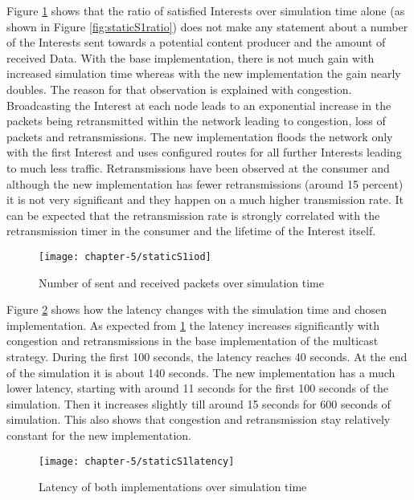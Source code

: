 Figure \ref{fig:staticS1iod} shows that the ratio of satisfied Interests over simulation time alone (as shown in Figure \ref{fig:staticS1ratio}) does not make any statement about a number of the Interests sent towards a potential content producer and the amount of received Data. With the base implementation, there is not much gain with increased simulation time whereas with the new implementation the gain nearly doubles. The reason for that observation is explained with congestion. Broadcasting the Interest at each node leads to an exponential increase in the packets being retransmitted within the network leading to congestion, loss of packets and retransmissions. The new implementation floods the network only with the first Interest and uses configured routes for all further Interests leading to much less traffic. Retransmissions have been observed at the consumer and although the new implementation has fewer retransmissions (around 15 percent) it is not very significant and they happen on a much higher transmission rate. It can be expected that the retransmission rate is strongly correlated with the retransmission timer in the consumer and the lifetime of the Interest itself.

\clearpage

\begin{figure}[H]
  \centering
  \texttt{[image: chapter-5/staticS1iod]}
  \caption{Number of sent and received packets over simulation time}
  \label{fig:staticS1iod}
\end{figure}

Figure \ref{fig:staticS1latency} shows how the latency changes with the simulation time and chosen implementation. As expected from \ref{fig:staticS1iod} the latency increases significantly with congestion and retransmissions in the base implementation of the multicast strategy. During the first 100 seconds, the latency reaches 40 seconds. At the end of the simulation it is about 140 seconds. The new implementation has a much lower latency, starting with around 11 seconds for the first 100 seconds of the simulation. Then it increases slightly till around 15 seconds for 600 seconds of simulation. This also shows that congestion and retransmission stay relatively constant for the new implementation.

\clearpage

\begin{figure}[H]
  \centering
  \texttt{[image: chapter-5/staticS1latency]}
  \caption{Latency of both implementations over simulation time}
  \label{fig:staticS1latency}
\end{figure}

